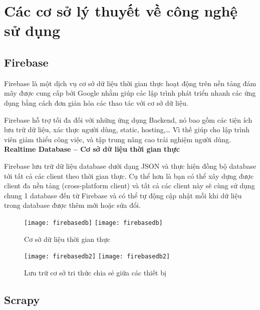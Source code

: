 \section{Các cơ sở lý thuyết về công nghệ sử dụng}
\subsection{Firebase}
Firebase là một dịch vụ cơ sở dữ liệu thời gian thực hoạt động trên nền tảng đám mây được cung cấp bởi Google nhằm giúp các lập trình phát triển nhanh các ứng dụng bằng cách đơn giản hóa các thao tác với cơ sở dữ liệu.

Firebase hỗ trợ tối đa đối với những ứng dụng Backend, nó bao gồm các tiện ích lưu trữ dữ liệu, xác thực người dùng, static, hosting,… Vì thế giúp cho lập trình viên giảm thiểu công việc, và tập trung nâng cao trải nghiệm người dùng.\\

\textbf{Realtime Database – Cơ sở dữ liệu thời gian thực}
 
Firebase lưu trữ dữ liệu database dưới dạng JSON và thực hiện đồng bộ database tới tất cả các client theo thời gian thực. Cụ thể hơn là bạn có thể xây dựng được client đa nền tảng (cross-platform client) và tất cả các client này sẽ cùng sử dụng chung 1 database đến từ Firebase và có thể tự động cập nhật mỗi khi dữ liệu trong database được thêm mới hoặc sửa đổi.
 
 \begin{figure}[!htbp]
  \begin{center}
    \ifpdf
      \texttt{[image: firebasedb]}
    \else
      \texttt{[image: firebasedb]}
    \fi
    \caption{Cơ sở dữ liệu thời gian thực }
    \label{FirebaseDB}
  \end{center}
\end{figure}

 \begin{figure}[!htbp]
  \begin{center}
    \ifpdf
      \texttt{[image: firebasedb2]}
    \else
      \texttt{[image: firebasedb2]}
    \fi
    \caption{Lưu trữ cơ sở tri thức chia sẻ giữa các thiết bị}
    \label{FirebaseDB2}
  \end{center}
\end{figure}

\subsection{Scrapy}

